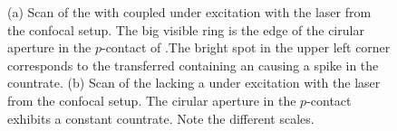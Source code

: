 	\begin{figure}[htp]
		\begin{subfigure}[t]{ 0.49\linewidth}
			\centering
			\caption{}
			\label{subfig::vcsel_confocal_laser_excitation_with_diamond}
		\end{subfigure}
		\hfill
		\begin{subfigure}[t]{ 0.49\linewidth}
			\centering
			\caption{}
			\label{subfig::confocal_laser_excitation_without_diamond}
		\end{subfigure}
		\caption[Scans of \VCSELs with and without \siv]{(a) Scan of the \BmFour with coupled \nd under excitation with the laser from the confocal setup. The big visible ring is the edge of the cirular aperture in the $p$-contact of \BmFour.The bright spot in the upper left corner corresponds to the transferred \nd containing an \siv causing a spike in the countrate. (b) Scan of the \BmTwo lacking a \nd under excitation with the laser from the confocal setup. The cirular aperture in the $p$-contact exhibits a constant countrate. Note the different scales.}
	\end{figure}

